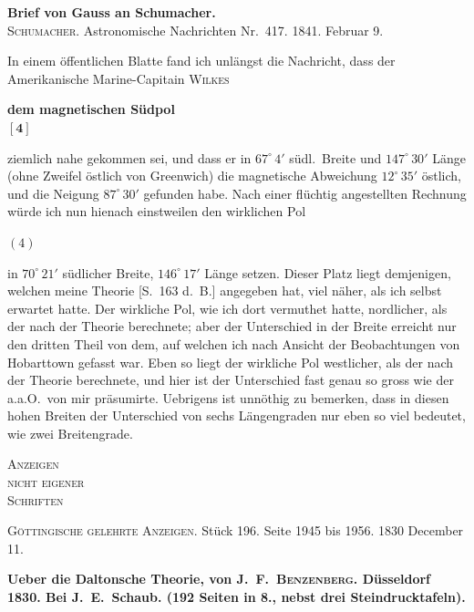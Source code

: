 \documentclass[12pt,a4paper]{article}
\begin{document}
\newpage
\noindent\textbf{Brief von Gauss an Schumacher.}\\
\textsc{Schumacher.} Astronomische Nachrichten Nr.~417. 1841. Februar 9.

\smallskip
\noindent
In einem \"offentlichen Blatte fand ich unl\"angst die Nachricht, dass der Amerikanische Marine-Capitain \textsc{Wilkes}
\begin{center}
\textbf{dem magnetischen S\"udpol}\\[0.5em]
$\boldsymbol{[4]}$
\end{center}
ziemlich nahe gekommen sei, und dass er in $67^\circ\,4'$ s\"udl.\ Breite und $147^\circ\,30'$ L\"ange (ohne Zweifel \"ostlich von Greenwich) die magnetische Abweichung $12^\circ\,35'$ \"ostlich, und die Neigung $87^\circ\,30'$ gefunden habe. Nach einer fl\"uchtig angestellten Rechnung w\"urde ich nun hienach einstweilen den wirklichen Pol
\begin{center}
\textbf{$(4)$}
\end{center}
in $70^\circ\,21'$ s\"udlicher Breite, $146^\circ\,17'$ L\"ange setzen. Dieser Platz liegt demjenigen, welchen meine Theorie [S.~163 d.~B.] angegeben hat, viel n\"aher, als ich selbst erwartet hatte. Der wirkliche Pol, wie ich dort vermuthet hatte, nordlicher, als der nach der Theorie berechnete; aber der Unterschied in der Breite erreicht nur den dritten Theil von dem, auf welchen ich nach Ansicht der Beobachtungen von Hobarttown gefasst war. Eben so liegt der wirkliche Pol westlicher, als der nach der Theorie berechnete, und hier ist der Unterschied fast genau so gross wie der a.a.O.\ von mir pr\"asumirte. Uebrigens ist unn\"othig zu bemerken, dass in diesen hohen Breiten der Unterschied von sechs L\"angengraden nur eben so viel bedeutet, wie zwei Breitengrade.

\newpage
\vspace*{3em}
\begin{center}
\Huge\textsc{Anzeigen}\\[0.5em]
\Large\textsc{nicht eigener}\\[0.3em]
\Huge\textsc{Schriften}
\end{center}
\vspace{3em}

\newpage
\noindent
\textsc{G\"ottingische gelehrte Anzeigen.} St\"uck 196. Seite 1945 bis 1956. 1830 December 11.

\bigskip
\noindent\textbf{Ueber die Daltonsche Theorie, von J.~F.~\textsc{Benzenberg}. D\"usseldorf 1830. Bei J.~E.~Schaub. (192 Seiten in 8., nebst drei Steindrucktafeln).}
\end{document}

